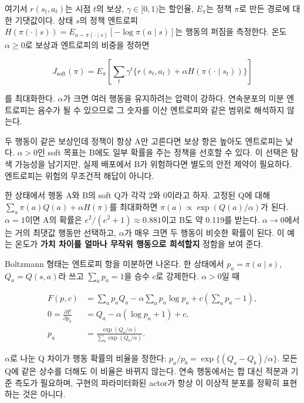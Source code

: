 \documentclass[11pt,a4paper]{article}
\begin{document}
여기서 $r(s_t,a_t)$는 시점 $t$의 보상, $\gamma\in[0,1)$는 할인율, $E_\pi$는 정책 $\pi$로 만든 경로에 대한 기댓값이다. 상태 $s$의 정책 엔트로피 $H(\pi(\cdot\mid s))=E_{a\sim\pi(\cdot\mid s)}[-\log\pi(a\mid s)]$는 행동의 퍼짐을 측정한다. 온도 $\alpha\ge0$로 보상과 엔트로피의 비중을 정하면\par

\[
J_{\mathrm{soft}}(\pi)
=E_\pi\!\left[\sum_t\gamma^t\{r(s_t,a_t)+\alpha H(\pi(\cdot\mid s_t))\}\right]
\]

를 최대화한다. $\alpha$가 크면 여러 행동을 유지하려는 압력이 강하다. 연속분포의 미분 엔트로피는 음수가 될 수 있으므로 그 숫자를 이산 엔트로피와 같은 범위로 해석하지 않는다.\par

두 행동이 같은 보상인데 정책이 항상 A만 고른다면 보상 항은 높아도 엔트로피는 낮다. $\alpha>0$인 soft 목표는 B에도 일부 확률을 주는 정책을 선호할 수 있다. 이 선택은 탐색 가능성을 남기지만, 실제 배포에서 B가 위험하다면 별도의 안전 제약이 필요하다. 엔트로피는 위험의 무조건적 해답이 아니다.\par

한 상태에서 행동 A와 B의 soft Q가 각각 2와 0이라고 하자. 고정된 Q에 대해 $\sum_a\pi(a)Q(a)+\alpha H(\pi)$를 최대화하면 $\pi(a)\propto\exp(Q(a)/\alpha)$가 된다. $\alpha=1$이면 A의 확률은 $e^2/(e^2+1)\approx0.881$이고 B도 약 0.119를 받는다. $\alpha\to0$에서는 거의 최댓값 행동만 선택하고, $\alpha$가 매우 크면 두 행동이 비슷한 확률이 된다. 이 예는 온도가 \textbf{가치 차이를 얼마나 무작위 행동으로 희석할지} 정함을 보여 준다.\par

Boltzmann 형태는 엔트로피 항을 미분하면 나온다. 한 상태에서 $p_a=\pi(a\mid s)$, $Q_a=Q(s,a)$라 쓰고 $\sum_a p_a=1$을 승수 $c$로 강제한다. $\alpha>0$일 때\par

\[
\begin{aligned}
F(p,c)&=\sum_a p_aQ_a-\alpha\sum_a p_a\log p_a
+c\left(\sum_a p_a-1\right),\\
0=\frac{\partial F}{\partial p_a}
&=Q_a-\alpha(\log p_a+1)+c,\\
p_a&=\frac{\exp(Q_a/\alpha)}{\sum_b\exp(Q_b/\alpha)}.
\end{aligned}
\]

$\alpha$로 나눈 Q 차이가 행동 확률의 비율을 정한다: $p_a/p_b=\exp\{(Q_a-Q_b)/\alpha\}$. 모든 Q에 같은 상수를 더해도 이 비율은 바뀌지 않는다. 연속 행동에서는 합 대신 적분과 기준 측도가 필요하며, 구현의 파라미터화된 actor가 항상 이 이상적 분포를 정확히 표현하는 것은 아니다.\par
\end{document}

